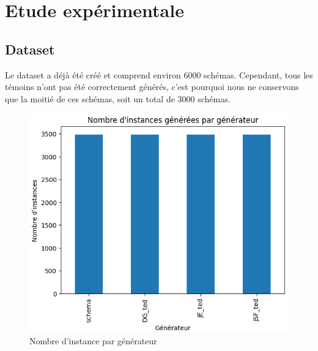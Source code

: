 \chapter{Etude expérimentale}
  \section{Dataset} 
    Le dataset a déjà été créé et comprend environ 6000 schémas. Cependant, tous les témoins n'ont pas été correctement générés, c'est pourquoi nous ne conservons que la moitié de ces schémas, soit un total de 3000 schémas.
    \begin{figure}[H]
      \centering
      \includegraphics[scale=0.7]{Photos/ted_vs_errors/nb_instance_filtree.PNG}
      \caption{Nombre d'instance par générateur}
      \label{fig:nb_instance_filtree}
    \end{figure}
